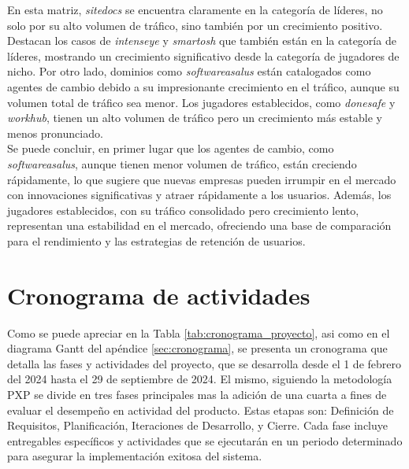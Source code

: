 En esta matriz, \textit{sitedocs} se encuentra claramente en la categoría de líderes, no solo por su alto volumen de tráfico, sino también por un crecimiento positivo. Destacan los casos de \textit{intenseye} y \textit{smartosh} que también están en la categoría de líderes, mostrando un crecimiento significativo desde la categoría de jugadores de nicho. Por otro lado, dominios como \textit{softwareasalus} están catalogados como agentes de cambio debido a su impresionante crecimiento en el tráfico, aunque su volumen total de tráfico sea menor. Los jugadores establecidos, como \textit{donesafe} y \textit{workhub}, tienen un alto volumen de tráfico pero un crecimiento más estable y menos pronunciado.\\ \indent
Se puede concluir, en primer lugar que los agentes de cambio, como \textit{softwareasalus}, aunque tienen menor volumen de tráfico, están creciendo rápidamente, lo que sugiere que nuevas empresas pueden irrumpir en el mercado con innovaciones significativas y atraer rápidamente a los usuarios. Además, los jugadores establecidos, con su tráfico consolidado pero crecimiento lento, representan una estabilidad en el mercado, ofreciendo una base de comparación para el rendimiento y las estrategias de retención de usuarios.

\section{Cronograma de actividades}
Como se puede apreciar en la Tabla \ref{tab:cronograma_proyecto}, asi como en el diagrama Gantt del apéndice \ref{sec:cronograma}, se presenta un cronograma que detalla las fases y actividades del proyecto, que se desarrolla desde el 1 de febrero del 2024 hasta el 29 de septiembre de 2024. El mismo, siguiendo la metodología PXP se divide en tres fases principales mas la adición de una cuarta a fines de evaluar el desempeño en actividad del producto. Estas etapas son: Definición de Requisitos, Planificación, Iteraciones de Desarrollo, y Cierre. Cada fase incluye entregables específicos y actividades que se ejecutarán en un periodo determinado para asegurar la implementación exitosa del sistema.

